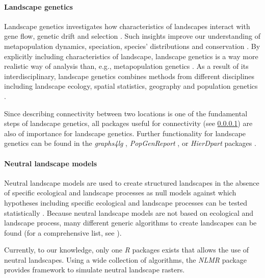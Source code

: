 \documentclass[smallextended]{svjour3}       %
\begin{document}
\hypertarget{sec:landscape_genetics}{%
\paragraph{Landscape genetics}\label{sec:landscape_genetics}}

Landscape genetics investigates how characteristics of landscapes
interact with gene flow, genetic drift and selection \cite{Manel2003}.
Such insights improve our understanding of metapopulation dynamics,
speciation, species' distributions and conservation \cite{Storfer2007}.
By explicitly including characteristics of landscape, landscape genetics
is a way more realistic way of analysis than, e.g., metapopulation
genetics \cite{Holderegger2006}. As a result of its interdisciplinary,
landscape genetics combines methods from different disciplines including
landscape ecology, spatial statistics, geography and population genetics
\cite{Storfer2007}.

Since describing connectivity between two locations is one of the
fundamental steps of landscape genetics, all packages useful for
connectivity (see \ref{sec:landscape_genetics}) are also of importance
for landscape genetics. Further functionality for landscape genetics can
be found in the \emph{graphs4lg} \cite{Savary2020}, \emph{PopGenReport}
\cite{Adamack2014,Gruber2015}, or \emph{HierDpart} packages
\cite{Qin2019}.

\hypertarget{sec:NLM}{%
\paragraph{Neutral landscape models}\label{sec:NLM}}

Neutral landscape models are used to create structured landscapes in the
absence of specific ecological and landscape processes as null models
against which hypotheses including specific ecological and landscape
processes can be tested statistically \cite{Gardner1987,With1997}.
Because neutral landscape models are not based on ecological and
landscape process, many different generic algorithms to create
landscapes can be found (for a comprehensive list, see
\cite{Sciaini2018}).

Currently, to our knowledge, only one \emph{R} packages exists that
allows the use of neutral landscapes. Using a wide collection of
algorithms, the \emph{NLMR} package \cite{Sciaini2018} provides
framework to simulate neutral landscape rasters.
\end{document}
